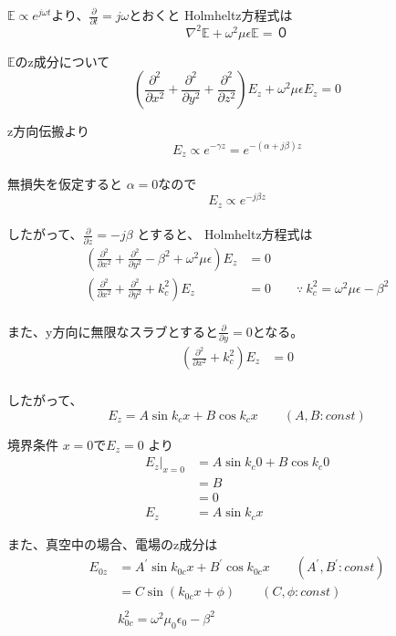 \documentclass[a4paper,10pt]{bxjsarticle}
\begin{document}
$\mathbb{E} \propto e^{j\omega t}$より、$\frac{\partial}{\partial t} = j\omega$とおくと
Holmheltz方程式は
$$
\nabla^2 \mathbb{E} + \omega^2 \mu \epsilon \mathbb{E} = ０
$$

$\mathbb{E}$のz成分について
$$
\left( 
    \frac{\partial^2}{\partial x^2} 
    + \frac{\partial^2}{\partial y^2} 
    + \frac{\partial^2}{\partial z^2} 
\right) E_z
+ \omega^2 \mu \epsilon E_z
= 0
$$

z方向伝搬より $$E_z \propto e^{-\gamma z} = e^{-(\alpha + j \beta)z}$$ \\
無損失を仮定すると $\alpha = 0$なので $$E_z \propto e^{ -j \beta z}$$ \\
したがって、$ \frac{\partial}{\partial z} = -j \beta $ とすると、
Holmheltz方程式は
\begin{align*} 
\left( 
    \frac{\partial^2}{\partial x^2} 
    + \frac{\partial^2}{\partial y^2} 
    - \beta^2 
    + \omega^2 \mu \epsilon
\right) E_z
&= 0 \\
\left( 
    \frac{\partial^2}{\partial x^2} 
    + \frac{\partial^2}{\partial y^2} 
    + k_c^2
\right) E_z
&= 0 \qquad
\because \ k_c^2 = \omega^2 \mu \epsilon - \beta^2 \\
\end{align*}

また、y方向に無限なスラブとすると$\frac{\partial}{\partial y} = 0$となる。
\begin{align*} 
    \left( 
        \frac{\partial^2}{\partial x^2} + k_c^2
    \right) E_z
    &= 0 \\
\end{align*}

したがって、
$$ E_z = A \sin k_c x + B \cos k_c x \qquad (A,B : const) $$

境界条件 $x = 0$で$E_z = 0$ より
\begin{align*}
    E_z|_{x=0} &= A \sin k_c 0 + B \cos k_c 0 \\
             &= B \\ 
             &= 0 \\
    E_z &= A \sin k_c x
\end{align*}

また、真空中の場合、電場のz成分は
\begin{align*}
    E_{0z} & = A^\prime \sin k_{0c} x + B^\prime \cos k_{0c} x
            \qquad (A^\prime, B^\prime : const) \\
           & = C \sin (k_{0c} x + \phi)
           \qquad (C, \phi : const) \\
           \\
    & k_{0c}^2 = \omega^2 \mu_0 \epsilon_0 - \beta^2 \\
\end{align*}
\end{document}
